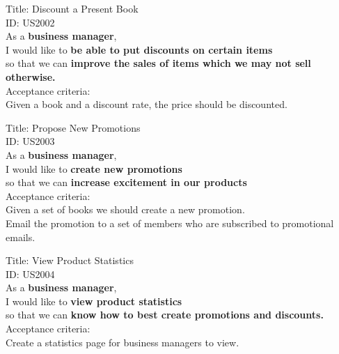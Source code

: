 \documentclass{article}
\begin{document}
\begin{framed}
\noindent
Title: Discount a Present Book \\
ID: US2002 \\
As a \textbf{business manager},\\
 \textbullet  \quad \quad I would like to \textbf{be able to put discounts on certain items}\\ 
 \textbullet  \quad \quad so that we can \textbf{improve the sales of items which we may not sell otherwise.}\\
 Acceptance criteria: \\
  \textbullet  \quad \quad Given a book and a discount rate, the price should be discounted.\\
\end{framed}

\begin{framed}
\noindent
Title: Propose New Promotions \\
ID: US2003 \\
As a \textbf{business manager},\\
 \textbullet  \quad \quad I would like to \textbf{create new promotions}\\ 
 \textbullet  \quad \quad so that we can \textbf{increase excitement in our products}\\
 Acceptance criteria: \\
  \textbullet  \quad \quad Given a set of books we should create a new promotion.\\
  \textbullet  \quad \quad Email the promotion to a set of members who are subscribed to promotional emails. \\
\end{framed}

\begin{framed}
\noindent
Title: View Product Statistics \\
ID: US2004 \\
As a \textbf{business manager},\\
 \textbullet  \quad \quad I would like to \textbf{view product statistics}\\ 
 \textbullet  \quad \quad so that we can \textbf{know how to best create promotions and discounts. }\\
 Acceptance criteria: \\
  \textbullet  \quad \quad Create a statistics page for business managers to view. \\
\end{framed}
\end{document}
